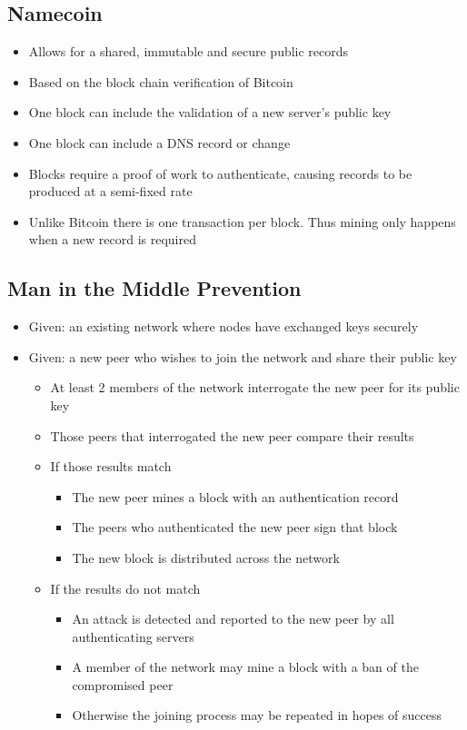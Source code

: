 \documentclass{IEEEtran}
\begin{document}
\subsection{Namecoin}
\begin{itemize}
\item
  Allows for a shared, immutable and secure public records
\item
  Based on the block chain verification of Bitcoin
\item
  One block can include the validation of a new server's public key
\item
  One block can include a DNS record or change
\item
  Blocks require a proof of work to authenticate, causing records to be
  produced at a semi-fixed rate
\item
  Unlike Bitcoin there is one transaction per block. Thus mining only
  happens when a new record is required
\end{itemize}
\subsection{Man in the Middle Prevention}

\begin{itemize}
\item
  Given: an existing network where nodes have exchanged keys securely
\item
  Given: a new peer who wishes to join the network and share their
  public key
  \begin{itemize}
  \item
    At least 2 members of the network interrogate the new peer for its
    public key
  \item
    Those peers that interrogated the new peer compare their results
  \item
    If those results match
    \begin{itemize}
    \item
      The new peer mines a block with an authentication record
    \item
      The peers who authenticated the new peer sign that block
    \item
      The new block is distributed across the network
    \end{itemize}
  \item
    If the results do not match
    \begin{itemize}
    \item
      An attack is detected and reported to the new peer by all
      authenticating servers
    \item
      A member of the network may mine a block with a ban of the
      compromised peer
    \item
      Otherwise the joining process may be repeated in hopes of success
    \end{itemize}
  \end{itemize}
\end{itemize}
\end{document}
